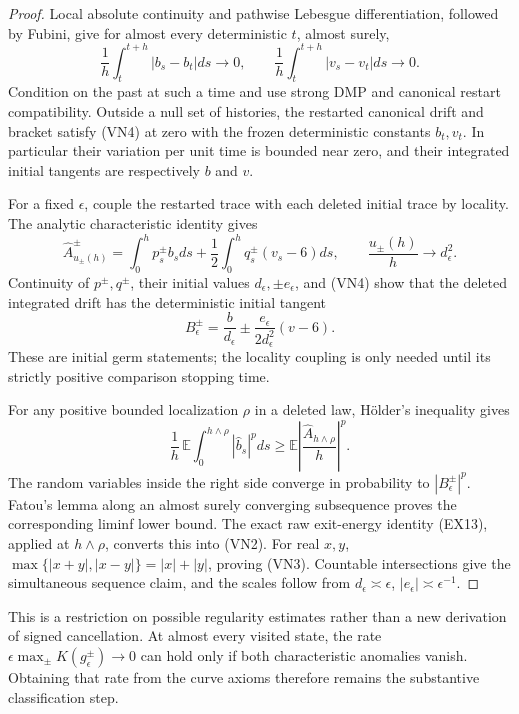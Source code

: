 \documentclass[11pt]{article}
\theoremstyle{definition}\newtheorem{definition}[theorem]{Definition}
\theoremstyle{remark}\newtheorem{remark}[theorem]{Remark}
\begin{document}
\begin{proof}
Local absolute continuity and pathwise Lebesgue differentiation,
followed by Fubini, give for almost every deterministic $t$, almost
surely,
\[
 \frac1h\int_t^{t+h}|b_s-b_t|ds\longrightarrow0,
 \qquad
 \frac1h\int_t^{t+h}|v_s-v_t|ds\longrightarrow0.
 \tag{VN4}
\]
Condition on the past at such a time and use strong DMP and canonical
restart compatibility. Outside a null set of histories, the restarted
canonical drift and bracket satisfy (VN4) at zero with the frozen
deterministic constants $b_t,v_t$. In particular their variation per
unit time is bounded near zero, and their integrated initial tangents
are respectively $b$ and $v$.

For a fixed $\epsilon$, couple the restarted trace with each deleted
initial trace by locality. The analytic characteristic identity gives
\[
 \widehat A^\pm_{u_\pm(h)}
 =\int_0^h p_s^\pm b_sds
   +\frac12\int_0^h q_s^\pm(v_s-6)ds,
 \qquad
 \frac{u_\pm(h)}h\longrightarrow d_\epsilon^2.
\]
Continuity of $p^\pm,q^\pm$, their initial values
$d_\epsilon,\pm e_\epsilon$, and (VN4) show that the deleted
integrated drift has the deterministic initial tangent
\[
 B_\epsilon^\pm=\frac b{d_\epsilon}
       \mathbin{\pm}\frac{e_\epsilon}{2d_\epsilon^2}(v-6).
 \tag{VN5}
\]
These are initial germ statements; the locality coupling is only
needed until its strictly positive comparison stopping time.

For any positive bounded localization $\rho$ in a deleted law,
H\"older's inequality gives
\[
 \frac1h\,\mathbb E\int_0^{h\wedge\rho}|\widehat b_s|^pds
 \ge\mathbb E\left|
          \frac{\widehat A_{h\wedge\rho}}h\right|^p.
\]
The random variables inside the right side converge in probability to
$|B_\epsilon^\pm|^p$. Fatou's lemma along an almost surely converging
subsequence proves the corresponding liminf lower bound. The exact
raw exit-energy identity (EX13), applied at $h\wedge\rho$, converts
this into (VN2). For real $x,y$,
$\max\{|x+y|,|x-y|\}=|x|+|y|$, proving (VN3). Countable intersections
give the simultaneous sequence claim, and the scales follow from
$d_\epsilon\asymp\epsilon$,
$|e_\epsilon|\asymp\epsilon^{-1}$.
\end{proof}

This is a restriction on possible regularity estimates rather than a
new derivation of signed cancellation. At almost every visited state,
the rate $\epsilon\max_\pm K(g_\epsilon^\pm)\to0$ can hold only if
both characteristic anomalies vanish. Obtaining that rate from the
curve axioms therefore remains the substantive classification step.
\end{document}
